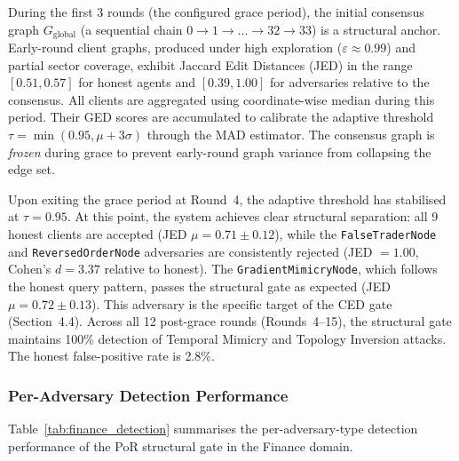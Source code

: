 \documentclass[journal]{IEEEtran}
\begin{document}
During the first 3 rounds (the configured grace period), the initial consensus graph $G_{\text{global}}$ (a sequential chain $0 \to 1 \to \dots \to 32 \to 33$) is a structural anchor. Early-round client graphs, produced under high exploration ($\varepsilon \approx 0.99$) and partial sector coverage, exhibit Jaccard Edit Distances (JED) in the range $[0.51, 0.57]$ for honest agents and $[0.39, 1.00]$ for adversaries relative to the consensus. All clients are aggregated using coordinate-wise median during this period. Their GED scores are accumulated to calibrate the adaptive threshold $\tau = \min(0.95, \mu + 3\sigma)$ through the MAD estimator. The consensus graph is \emph{frozen} during grace to prevent early-round graph variance from collapsing the edge set.

Upon exiting the grace period at Round~4, the adaptive threshold has stabilised at $\tau = 0.95$. At this point, the system achieves clear structural separation: all 9 honest clients are accepted (JED $\mu = 0.71 \pm 0.12$), while the \texttt{FalseTraderNode} and \texttt{ReversedOrderNode} adversaries are consistently rejected (JED $= 1.00$, Cohen's $d = 3.37$ relative to honest). The \texttt{GradientMimicryNode}, which follows the honest query pattern, passes the structural gate as expected (JED $\mu = 0.72 \pm 0.13$). This adversary is the specific target of the CED gate (Section~4.4). Across all 12 post-grace rounds (Rounds~4--15), the structural gate maintains 100\% detection of Temporal Mimicry and Topology Inversion attacks. The honest false-positive rate is 2.8\%.

\subsubsection{Per-Adversary Detection Performance}

Table~\ref{tab:finance_detection} summarises the per-adversary-type detection performance of the PoR structural gate in the Finance domain.

\begin{table}[h]
\centering
\caption{Per-Adversary Detection Performance (Finance Domain, Rounds 4--15, $\tau=0.95$)}
\label{tab:finance_detection}
\end{table}
\end{document}
